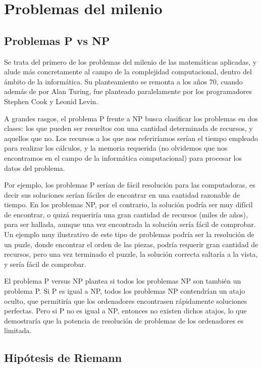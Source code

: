 
\section{Problemas del milenio}

\subsection{Problemas P vs NP}
Se trata del primero de los problemas del milenio de las matemáticas aplicadas,
y alude más concretamente al campo de la complejidad computacional, dentro del
ámbito de la informática. Su planteamiento se remonta a los años 70, cuando
además de por Alan Turing, fue planteado paralelamente por los programadores
Stephen Cook y Leonid Levin.

A grandes rasgos, el problema P frente a NP busca clasificar los problemas en
dos clases: los que pueden ser resueltos con una cantidad determinada de
recursos, y aquellos que no. Los recursos a los que nos referiríamos serían el
tiempo empleado para realizar los cálculos, y la memoria requerida (no olvidemos
que nos encontramos en el campo de la informática computacional) para procesar
los datos del problema.

Por ejemplo, los problemas P serían de fácil resolución para las computadoras, es
decir sus soluciones serían fáciles de encontrar en una cantidad razonable de
tiempo. En los problemas NP, por el contrario, la solución podría ser muy
difícil de encontrar, o quizá requeriría una gran cantidad de recursos (miles de
años), para ser hallada, aunque una vez encontrada la solución sería fácil de
comprobar. Un ejemplo muy ilustrativo de este tipo de problemas podría ser la
resolución de un puzle, donde encontrar el orden de las piezas, podría requerir
gran cantidad de recursos, pero una vez terminado el puzzle, la solución
correcta saltaría a la vista, y sería fácil de comprobar.

El problema P versus NP plantea si todos los problemas NP son también un
problema P. Si P es igual a NP, todos los problemas NP contendrían un atajo
oculto, que permitiría que los ordenadores encontrasen rápidamente soluciones
perfectas. Pero si P no es igual a NP, entonces no existen dichos atajos, lo que
demostraría que la potencia de resolución de problemas de los ordenadores es
limitada.

\subsection{Hipótesis de Riemann}

